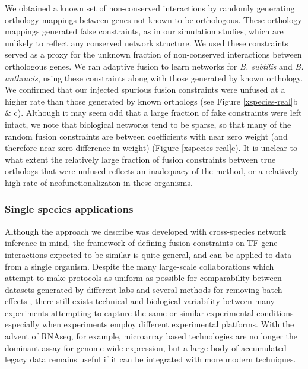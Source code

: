 \documentclass[11pt]{article}
\begin{document}
We obtained a known set of non-conserved interactions by randomly generating orthology mappings between genes not known to be orthologous. These orthology mappings generated false constraints, as in our simulation studies,  which are unlikely to reflect any conserved network structure. We used these constraints served as a proxy for the unknown fraction of non-conserved interactions between orthologous genes. 
 We ran adaptive fusion to learn networks for \textit{B. subtilis} and \textit{B. anthracis}, using these constraints along with those generated by known orthology. We confirmed that our injected spurious fusion constraints were unfused at a higher rate than those generated by known orthologs (see Figure \ref{xspecies-real}b & c). Although it may seem odd that a large fraction of fake constraints were left intact, we note that biological networks tend to be sparse, so that many of the random fusion constraints are between coefficients with near zero weight (and therefore near zero difference in weight) (Figure \ref{xspecies-real}c). It is unclear to what extent the relatively large fraction of fusion constraints between true orthologs that were unfused reflects an inadequacy of the method, or a relatively high rate of neofunctionalizaton in these organisms.


 \subsubsection{Single species applications}
 
Although the approach we describe was developed with cross-species network inference in mind, the framework of defining fusion constraints on TF-gene interactions expected to be similar is quite general, and can be applied to data from a single organism. Despite the many large-scale collaborations which attempt to make protocols as uniform as possible for comparability between datasets generated by different labs \cite{paten_nih_2015,kundaje_integrative_2015} and several methods for removing batch effects \cite{irizarry_exploration_2003,johnson_adjusting_2007}, there still exists technical and biological variability between many experiments attempting to capture the same or similar experimental conditions especially when experiments employ different experimental platforms. 
With the advent of RNAseq, for example, microarray based technologies are no longer the dominant assay for genome-wide expression, but a large body of accumulated legacy data remains useful if it can be integrated with more modern techniques.
\end{document}
